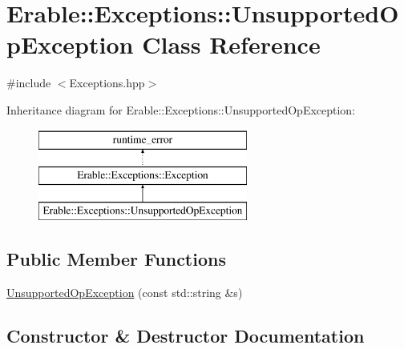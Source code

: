 \hypertarget{class_erable_1_1_exceptions_1_1_unsupported_op_exception}{}\section{Erable\+::Exceptions\+::Unsupported\+Op\+Exception Class Reference}
\label{class_erable_1_1_exceptions_1_1_unsupported_op_exception}


{\ttfamily \#include $<$Exceptions.\+hpp$>$}

Inheritance diagram for Erable\+::Exceptions\+::Unsupported\+Op\+Exception\+:\begin{figure}[H]
\begin{center}
\leavevmode
\includegraphics[height=3.000000cm]{class_erable_1_1_exceptions_1_1_unsupported_op_exception}
\end{center}
\end{figure}
\subsection*{Public Member Functions}
\begin{DoxyCompactItemize}
\item 
\mbox{\hyperlink{class_erable_1_1_exceptions_1_1_unsupported_op_exception_abfc081f7ec89736b39d398b711338690}{Unsupported\+Op\+Exception}} (const std\+::string \&s)
\end{DoxyCompactItemize}


\subsection{Constructor \& Destructor Documentation}
\mbox{\label{class_erable_1_1_exceptions_1_1_unsupported_op_exception_abfc081f7ec89736b39d398b711338690}} 
